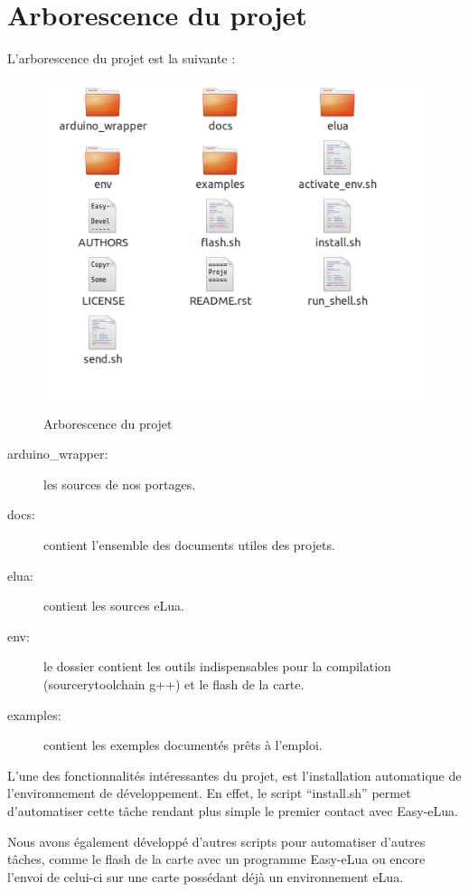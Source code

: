 \chapter[Arborescence du projet]{Arborescence du projet}
\label{chap:chap7}

L'arborescence du projet est la suivante :

\begin{figure}[h]
\begin{center}
\includegraphics[scale=0.6]{../images/arborescence.png}
\caption{Arborescence du projet}
\end{center}
\end{figure}

\begin{description}
 \item[arduino\_wrapper: ] les sources de nos portages.
 \item[docs: ] contient l’ensemble des documents utiles des projets.
 \item[elua: ] contient les sources eLua.
 \item[env: ] le dossier contient les outils indispensables pour la compilation (sourcerytoolchain g++) et le flash de la carte.
 \item[examples: ] contient les exemples documentés prêts à l’emploi.
\end{description}

L’une des fonctionnalités intéressantes du projet, est l’installation automatique de l’environnement de développement.
En effet, le script ``install.sh'' permet d’automatiser cette tâche rendant plus simple le premier contact avec Easy-eLua.

Nous avons également développé d’autres scripts pour automatiser d’autres tâches, comme le flash de la carte avec un programme
Easy-eLua ou encore l’envoi de celui-ci sur une carte possédant déjà un environnement eLua.
